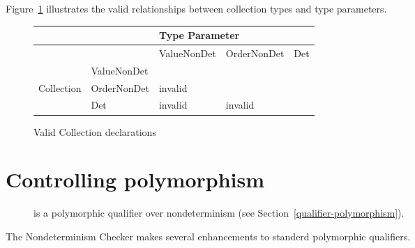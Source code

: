 Figure~\ref{fig-nondeterminism-collections} illustrates the valid
relationships between collection types and type parameters.

\begin{figure}
  \centering
  \begin{tabular}{|l|l|l|l|l|}
    \hline
    &   &  \multicolumn{3}{l|}{Type Parameter}                                                                       \\ \hline
    &             & ValueNonDet                                     & OrderNonDet              & Det \\ \cline{2-5}
              & ValueNonDet &                                                 &                          &     \\ \cline{2-5}
Collection    & OrderNonDet &   invalid  &                          &     \\ \cline{2-5}
              & Det         &   invalid               &    invalid  &     \\ \hline
  \end{tabular}
  \caption{Valid Collection declarations}
  \label{fig-nondeterminism-collections}
\end{figure}





\section{Controlling polymorphism\label{nondeterminism-polymorphism}}

\begin{description}
\item[] is a
  polymorphic qualifier over nondeterminism (see Section~\ref{qualifier-polymorphism}).
\end{description}

The Nondeterminism Checker makes
several enhancements to standerd polymorphic qualifiers.


